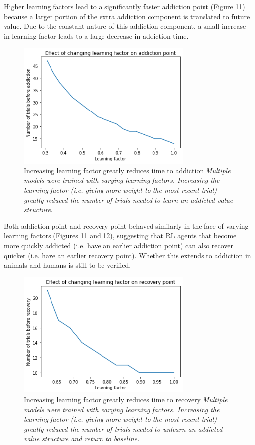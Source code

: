 \documentclass[10pt,letterpaper]{article}
\begin{document}
Higher learning factors lead to a significantly faster addiction point (Figure 11) because a larger portion of the extra addiction component is translated to future value. Due to the constant nature of this addiction component, a small increase in learning factor leads to a large decrease in addiction time.

\begin{figure}[H]
   \centering
    \includegraphics[width = 85mm]{graphs/learning_addiction.png}
    \caption{Increasing learning factor greatly reduces time to addiction
    \newline \emph{Multiple models were trained with varying learning factors. Increasing the learning factor (i.e. giving more weight to the most recent trial) greatly reduced the number of trials needed to learn an addicted value structure.}}
    \label{fig:Baseline}
\end{figure}

Both addiction point and recovery point behaved similarly in the face of varying learning factors (Figures 11 and 12), suggesting that RL agents that become more quickly addicted (i.e. have an earlier addiction point) can also recover quicker (i.e. have an earlier recovery point). Whether this extends to addiction in animals and humans is still to be verified.

\begin{figure}[H]
   \centering
    \includegraphics[width = 85mm]{graphs/learning_recovery.png}
    \caption{Increasing learning factor greatly reduces time to recovery
    \newline \emph{Multiple models were trained with varying learning factors. Increasing the learning factor (i.e. giving more weight to the most recent trial) greatly reduced the number of trials needed to unlearn an addicted value structure and return to baseline.}}
    \label{fig:Baseline}
\end{figure}
\end{document}
